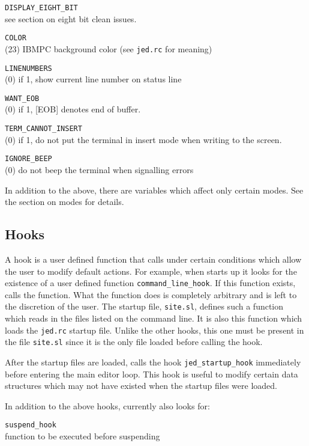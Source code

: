       \verb|DISPLAY_EIGHT_BIT|\\
            see section on eight bit clean issues.

      \verb|COLOR|\\
       (23) IBMPC background color (see \verb|jed.rc| for meaning)

      \verb|LINENUMBERS|\\
       (0) if 1, show current line number on status line

      \verb|WANT_EOB|\\
       (0) if 1, [EOB] denotes end of buffer.

      \verb|TERM_CANNOT_INSERT|\\
       (0) if 1, do not put the terminal in insert mode when writing to the
       screen.
              
      \verb|IGNORE_BEEP|\\
       (0) do not beep the terminal when signalling errors


  In addition to the above, there are variables which affect only certain
  modes.  See the section on modes for details.

\subsection{Hooks}

  A hook is a user defined function that \jed{} calls under certain conditions
  which allow the user to modify default actions.  For example, when \jed{}
  starts up it looks for the existence of a user defined function
  \verb|command_line_hook|.  If this function exists, \jed{} calls the
  function. What the function does is completely arbitrary and is left to
  the discretion of the user.  The startup file, \verb|site.sl|, defines
  such a function which reads in the files listed on the command line. It is
  also this function which loads the \verb|jed.rc| startup file.  Unlike the
  other hooks, this one must be present in the file \verb|site.sl| since it
  is the only file loaded before calling the hook.

  After the startup files are loaded, \jed{} calls the hook
  \verb|jed_startup_hook| immediately before entering the main editor loop.
  This hook is useful to modify certain data structures which may not have
  existed when the startup files were loaded.

  In addition to the above hooks, \jed{} currently also looks for:

      \verb|suspend_hook|\\
        function to be executed before suspending

